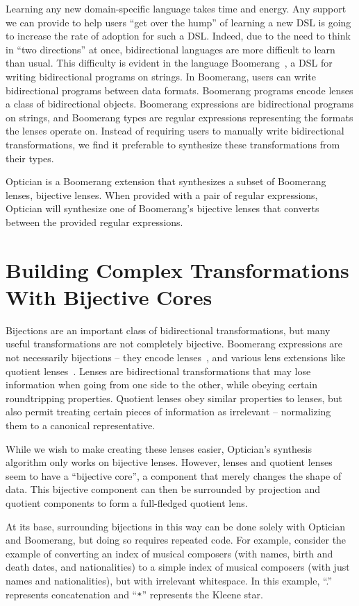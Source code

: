 \documentclass[a4paper]{article}
\begin{document}
Learning any new domain-specific language takes time and energy. Any support we
can provide to help users ``get over the hump'' of learning a new DSL is going
to increase the rate of adoption for such a DSL. Indeed, due to the need to
think in ``two directions'' at once, bidirectional languages are more difficult
to learn than usual. This difficulty is evident in the language
Boomerang~\cite{boomerang}, a DSL for writing bidirectional programs on strings.
In Boomerang, users can write bidirectional programs between data formats.
Boomerang programs encode lenses a class of bidirectional objects. Boomerang
expressions are bidirectional programs on strings, and Boomerang types are
regular expressions representing the formats the lenses operate on. Instead of
requiring users to manually write bidirectional transformations, we find it
preferable to synthesize these transformations from their types.

Optician is a Boomerang extension that synthesizes a subset of Boomerang lenses,
bijective lenses. When provided with a pair of regular expressions, Optician
will synthesize one of Boomerang's bijective lenses that converts between the
provided regular expressions.

\section{Building Complex Transformations With Bijective Cores}

Bijections are an important class of bidirectional transformations, but many
useful transformations are not completely bijective. Boomerang expressions are
not necessarily bijections -- they encode lenses~\cite{Focal2005-long2}, and
various lens extensions like quotient lenses~\cite{quotientlenses}. Lenses are
bidirectional transformations that may lose information when going from one side
to the other, while obeying certain roundtripping properties. Quotient lenses
obey similar properties to lenses, but also permit treating certain pieces of
information as irrelevant -- normalizing them to a canonical representative.

While we wish to make creating these lenses easier, Optician's synthesis algorithm
only works on bijective lenses. However, lenses and quotient lenses seem to have
a ``bijective core'', a component that merely changes the shape of data.
This bijective component can then be surrounded by projection and quotient
components to form a full-fledged quotient lens.

At its base, surrounding bijections in this way can be done solely with Optician
and Boomerang, but doing so requires repeated code. For example, consider the
example of converting an index of musical composers (with names, birth and death
dates, and nationalities) to a simple index of musical composers (with just
names and nationalities), but with irrelevant whitespace. In this example, ``.''
represents concatenation and ``\lstinline{*}'' represents the Kleene star.
\end{document}
